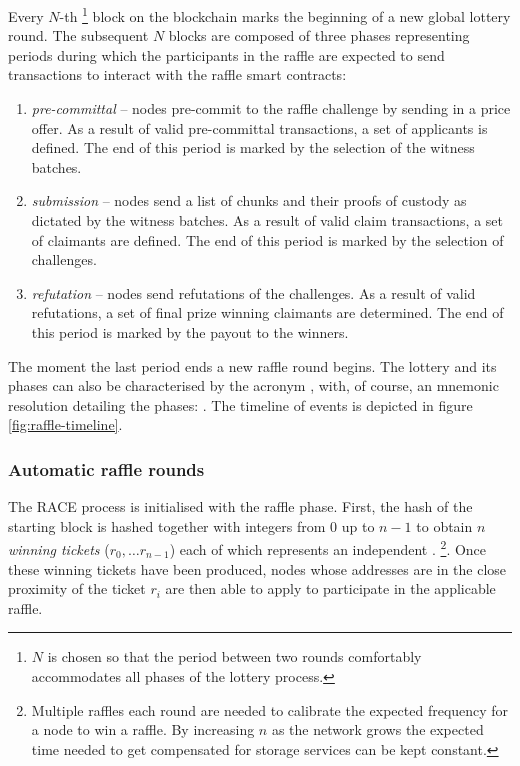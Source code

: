 Every $N$-th%
%
\footnote{$N$ is chosen so that the period  between two rounds comfortably accommodates all phases of the lottery process.}
%
block on the blockchain marks the beginning of a new global lottery round.
The subsequent $N$ blocks are composed of three phases representing periods during which the participants in the raffle are expected to send transactions to interact with the raffle smart contracts: 

\begin{enumerate}
\item \emph{pre-committal} -- nodes pre-commit to the raffle challenge by sending in a price offer. As a result of valid pre-committal transactions, a set of applicants is defined. The end of this period is marked by the selection of the witness batches.
\item \emph{submission} -- nodes send a list of chunks and their proofs of custody as dictated by the witness batches. As a result of valid claim transactions, a set of claimants are defined. The end of this period is marked by the selection of challenges.
\item \emph{refutation} -- nodes send refutations of the challenges. As a result of valid refutations, a set of final prize winning claimants are determined. The end of this period is marked by the payout to the winners.
\end{enumerate}

The moment the last period ends a new raffle round begins. The lottery and its phases can also be characterised by the acronym , with, of course, an mnemonic resolution detailing the phases: . The timeline of events is depicted in figure \ref{fig:raffle-timeline}.


\subsubsection{Automatic raffle rounds}

The RACE process is initialised with the raffle phase. First, the hash of the starting block is hashed together with integers from $0$ up to $n-1$ to obtain $n$ \emph{winning tickets} ($r_0, \ldots r_{n-1}$) each of which represents an independent .%
%
\footnote{Multiple raffles each round are needed to calibrate the expected frequency for a node to win a raffle. By increasing $n$ as the network grows the expected time needed to get compensated for storage services can be kept constant.}. 
%
Once these winning tickets have been produced, nodes whose addresses are in the close proximity of the ticket $r_i$ are then able to apply to participate in the applicable raffle.


